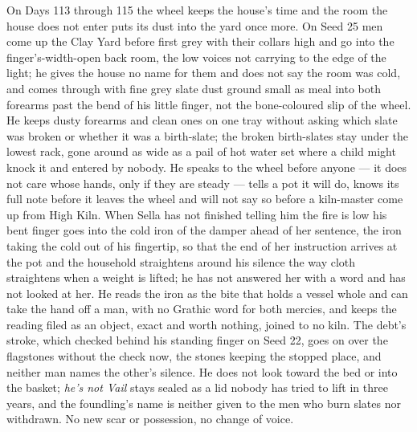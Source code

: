 \documentclass{design/chronicle}
\begin{document}
{On Days 113 through 115 the wheel keeps the house’s time and the room the house does not enter puts its dust into the yard once more. On Seed 25 men come up the Clay Yard before first grey with their collars high and go into the finger’s-width-open back room, the low voices not carrying to the edge of the light; he gives the house no name for them and does not say the room was cold, and comes through with fine grey slate dust ground small as meal into both forearms past the bend of his little finger, not the bone-coloured slip of the wheel. He keeps dusty forearms and clean ones on one tray without asking which slate was broken or whether it was a birth-slate; the broken birth-slates stay under the lowest rack, gone around as wide as a pail of hot water set where a child might knock it and entered by nobody. He speaks to the wheel before anyone — it does not care whose hands, only if they are steady — tells a pot it will do, knows its full note before it leaves the wheel and will not say so before a kiln-master come up from High Kiln. When Sella has not finished telling him the fire is low his bent finger goes into the cold iron of the damper ahead of her sentence, the iron taking the cold out of his fingertip, so that the end of her instruction arrives at the pot and the household straightens around his silence the way cloth straightens when a weight is lifted; he has not answered her with a word and has not looked at her. He reads the iron as the bite that holds a vessel whole and can take the hand off a man, with no Grathic word for both mercies, and keeps the reading filed as an object, exact and worth nothing, joined to no kiln. The debt’s stroke, which checked behind his standing finger on Seed 22, goes on over the flagstones without the check now, the stones keeping the stopped place, and neither man names the other’s silence. He does not look toward the bed or into the basket; \emph{he’s not Vail} stays sealed as a lid nobody has tried to lift in three years, and the foundling’s name is neither given to the men who burn slates nor withdrawn. No new scar or possession, no change of voice.

}
\end{document}
